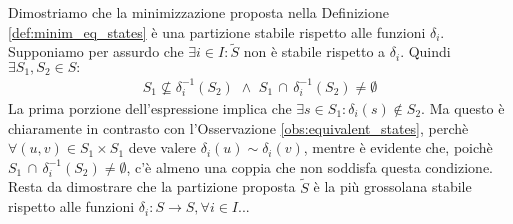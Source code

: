 \begin{proof2}
    Dimostriamo che la minimizzazione proposta nella Definizione \ref*{def:minim_eq_states} è una partizione stabile rispetto alle funzioni $\delta_i$. Supponiamo per assurdo che $\exists i \in I : \widetilde{S}$ non è stabile rispetto a $\delta_i$. Quindi $\exists S_1, S_2 \in S :$
    \begin{gather*}
        S_1 \not\subseteq \delta_i^{-1}(S_2) \,\, \land \,\, S_1 \,\cap \,\delta_i^{-1}(S_2) \neq \emptyset
    \end{gather*}
    La prima porzione dell'espressione implica che $\exists s \in S_1 : \delta_i(s) \not\in S_2$. Ma questo è chiaramente in contrasto con l'Osservazione \ref*{obs:equivalent_states}, perchè $\forall (u,v) \in S_1 \times S_1$ deve valere $\delta_i(u) \sim \delta_i(v)$, mentre è evidente che, poichè $S_1 \,\cap\, \delta_i^{-1}(S_2) \neq \emptyset$, c'è almeno una coppia che non soddisfa questa condizione.\\
    Resta da dimostrare che la partizione proposta $\widetilde{S}$ è la più grossolana stabile rispetto alle funzioni $\delta_i : S \to S, \forall i \in I$... %
\end{proof2}

